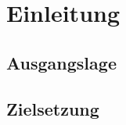%
%


\chapter{Einleitung}
\lipsum[33-37]
\section{Ausgangslage}
\lipsum[5-9]
\section{Zielsetzung}
\lipsum[11-13]
